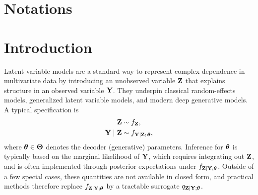 \documentclass[twoside,11pt]{article}
\begin{document}
\begin{abstract}
Because the centered equations need only samples or expectations under the surrogate---never the marginal likelihood, never a differentiable encoder---they deliver: (i) decoder estimation invariant to the response dimension and immune to amortization bias, with recovery that \emph{improves} as the dimension grows; (ii) calibrated uncertainty, validated to near-nominal coverage by a re-solving parametric bootstrap, in a regime where deterministic observed-information standard errors---including those of standard software---are unreliable; (iii) a bounded-influence, outlier-robust estimator obtained simply by bounding the statistic, with the centering supplying Fisher consistency automatically; and (iv) a Gaussian-process latent variable model (GP-GLLVM) fit at a cost independent of the number of observations, recovering per-factor temporal or spatial length-scales at a scale where likelihood-based and variational methods do not apply. We demonstrate the last on 10x Visium spatial transcriptomics, recovering a scale-resolved, count-native factor decomposition of mouse-brain tissue. These are instances of a single composable construction---the encoder, the statistic, and the latent prior are each free choices---bringing a broader class of scalable, structured latent variable models within reach.

\end{abstract}



\newpage

\listoftodos
\newpage

\section{Notations}

\newpage


\newpage

\section{Introduction}

Latent variable models are a standard way to represent complex dependence in multivariate data by introducing an unobserved variable ${\bf Z}$ that explains structure in an observed variable ${\bf Y}$.
They underpin classical random-effects models, generalized latent variable models, and modern deep generative models.
A typical specification is
\begin{align}
{\bf Z} &\sim f_{{\bf Z}}, \nonumber\\
{\bf Y} \mid {\bf Z} &\sim f_{{\bf Y}\mid {\bf Z};\,{\bm{\theta}}},
\label{eq:intro_generative}
\end{align}
where ${\bm{\theta}}\in\bm\Theta$ denotes the decoder (generative) parameters.
Inference for ${\bm{\theta}}$ is typically based on the marginal likelihood of ${\bf Y}$,
which requires integrating out ${\bf Z}$, and is often implemented through posterior expectations under $f_{{\bf Z}\mid{\bf Y};{\bm{\theta}}}$.
Outside of a few special cases, these quantities are not available in closed form, and practical methods therefore replace $f_{{\bf Z}\mid{\bf Y};{\bm{\theta}}}$ by a tractable surrogate $q_{{\bf Z}\mid{\bf Y};{\bm{\theta}}}$.
\end{document}
